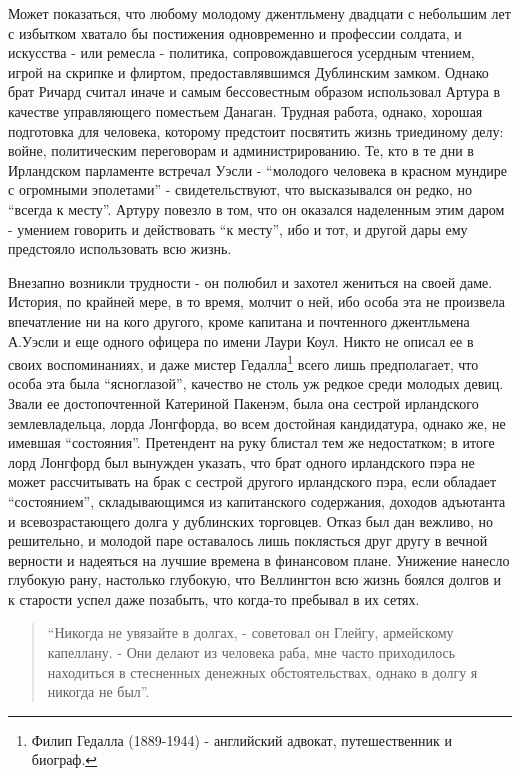 \documentclass[
  oneside,
  12pt,
  titlepage]{book}
\begin{document}
Может показаться, что любому молодому джентльмену двадцати с небольшим лет с избытком хватало бы постижения одновременно и профессии солдата, и искусства - или ремесла - политика, сопровождавшегося усердным чтением, игрой на скрипке и флиртом, предоставлявшимся Дублинским замком. Однако брат Ричард считал иначе и самым бессовестным образом использовал Артура в качестве управляющего поместьем Данаган. Трудная работа, однако, хорошая подготовка для человека, которому предстоит посвятить жизнь триединому делу: войне, политическим переговорам и администрированию. Те, кто в те дни в Ирландском парламенте встречал Уэсли - ``молодого человека в красном мундире с огромными эполетами'' - свидетельствуют, что высказывался он редко, но ``всегда к месту''. Артуру повезло в том, что он оказался наделенным этим даром - умением говорить и действовать ``к месту'', ибо и тот, и другой дары ему предстояло использовать всю жизнь.

Внезапно возникли трудности - он полюбил и захотел жениться на своей даме. История, по крайней мере, в то время, молчит о ней, ибо особа эта не произвела впечатление ни на кого другого, кроме капитана и почтенного джентльмена А.Уэсли и еще одного офицера по имени Лаури Коул. Никто не описал ее в своих воспоминаниях, и даже мистер Гедалла\footnote{Филип Гедалла (1889-1944) - английский адвокат, путешественник и биограф.} всего лишь предполагает, что особа эта была ``ясноглазой'', качество не столь уж редкое среди молодых девиц. Звали ее достопочтенной Катериной Пакенэм, была она сестрой ирландского землевладельца, лорда Лонгфорда, во всем достойная кандидатура, однако же, не имевшая ``состояния''. Претендент на руку блистал тем же недостатком; в итоге лорд Лонгфорд был вынужден указать, что брат одного ирландского пэра не может рассчитывать на брак с сестрой другого ирландского пэра, если обладает ``состоянием'', складывающимся из капитанского содержания, доходов адъютанта и всевозрастающего долга у дублинских торговцев. Отказ был дан вежливо, но решительно, и молодой паре оставалось лишь поклясться друг другу в вечной верности и надеяться на лучшие времена в финансовом плане. Унижение нанесло глубокую рану, настолько глубокую, что Веллингтон всю жизнь боялся долгов и к старости успел даже позабыть, что когда-то пребывал в их сетях.

\begin{quote}
``Никогда не увязайте в долгах, - советовал он Глейгу, армейскому капеллану. - Они делают из человека раба, мне часто приходилось находиться в стесненных денежных обстоятельствах, однако в долгу я никогда не был''.
\end{quote}
\end{document}
